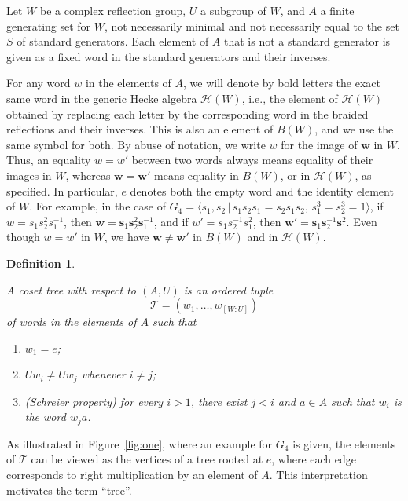 \documentclass[11pt, reqno]{amsart}
\newcommand{\cH}{\mathcal{H}}
\newcommand{\bw}{\mathbf{w}}
\newcommand{\bs}{\mathbf{s}}
\numberwithin{equation}{section}
\newtheorem{definition}[theorem]{Definition}
\theoremstyle{remark}
\begin{document}
	Let $W$ be a complex reflection group, $U$ a subgroup of $W$,
	and $A$ a finite generating set for $W$, not necessarily minimal and not
	necessarily equal to the set $S$ of standard generators. Each element of
	$A$ that is not a standard generator is given as a fixed word in the
	standard generators and their inverses. 
	
	For any word $w$ in the elements of $A$, we will denote by bold letters the exact same word in the generic Hecke algebra $\cH(W)$, i.e., the element of $\cH(W)$ obtained by
	replacing each letter by the corresponding word in the braided
	reflections and their inverses. This is also an element of $B(W)$, and we use the same symbol for both. 
	By abuse of notation, we 
	write $w$ for the image of $\bw$ in $W$. Thus, an equality $w=w'$ between two words always means equality of their images in $W$, whereas $\bw=\bw'$ means equality in $B(W)$, or in $\cH(W)$, as specified. In particular, $e$ denotes both the
	empty word and the identity element of $W$.
	For example, in the case of $G_4=\langle s_1,s_2 \,|\, s_1s_2s_1=s_2s_1s_2,\, s_1^3=s_2^3=1\rangle$, if $w=s_1s_2^2s_1^{-1}$, then $\bw=\bs_1\bs_2^2\bs_1^{-1}$, 
	and  if $w'=s_1s_2^{-1}s_1^{2}$, then $\bw'=\bs_1\bs_2^{-1}\bs_1^{2}$. Even though $w=w'$ in $W$, we have $\bw \neq \bw'$ in $B(W)$ and in $\cH(W)$.
	
	
	\begin{definition}\label{treec}{\rm
			A \emph{coset tree} with respect to $(A,U)$ is an ordered tuple
			\[
			\mathcal{T}=(w_1,\ldots,w_{[W:U]})
			\]
			of words in the elements of $A$ such that
			\begin{enumerate}
				\item $w_1=e$;\smallbreak
				\item $Uw_i\neq Uw_j$ whenever $i\neq j$;\smallbreak
				\item (\emph{Schreier property}) for every $i>1$, there exist $j<i$ and $a\in A$ such that $w_i$ is the word $w_ja$.
		\end{enumerate}}
	\end{definition}
	
	
	
	As illustrated in Figure~\ref{fig:one}, where an example for $G_4$ is given,
	the elements of $\mathcal{T}$ can be viewed as the vertices of a tree rooted at $e$, where each edge corresponds to right multiplication by an element of $A$. This interpretation motivates the term ``tree''.
	
\end{document}
